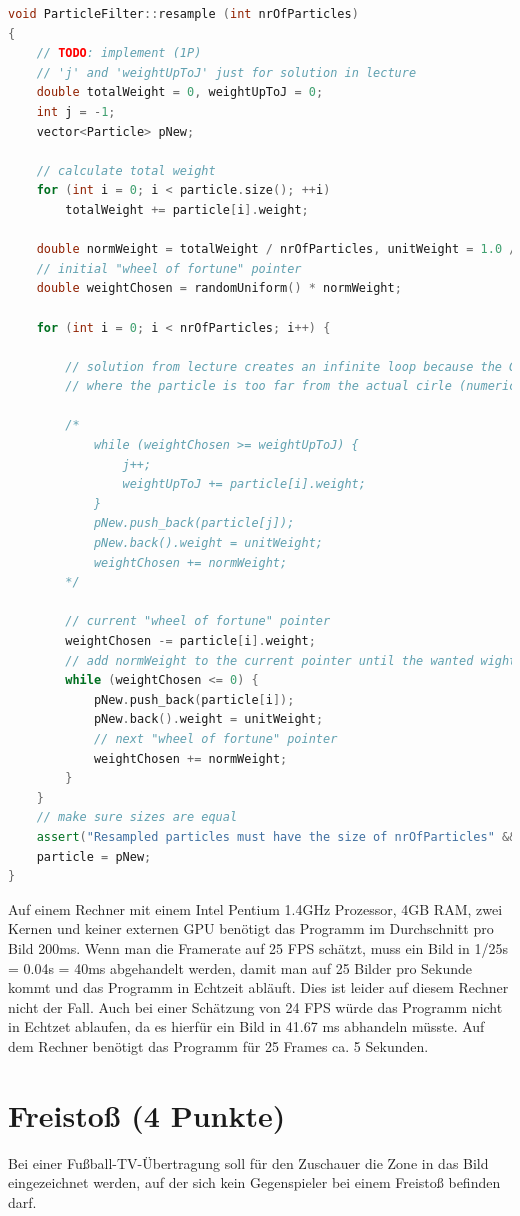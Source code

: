 \documentclass{ezb}
\begin{document}
\begin{lstlisting}[language=C++, caption=Draw particles from the particle set resetting their weight to 1.]
void ParticleFilter::resample (int nrOfParticles)
{
	// TODO: implement (1P)
	// 'j' and 'weightUpToJ' just for solution in lecture
	double totalWeight = 0, weightUpToJ = 0;
	int j = -1;
	vector<Particle> pNew;

	// calculate total weight
	for (int i = 0; i < particle.size(); ++i)
		totalWeight += particle[i].weight;

	double normWeight = totalWeight / nrOfParticles, unitWeight = 1.0 / nrOfParticles;
	// initial "wheel of fortune" pointer
	double weightChosen = randomUniform() * normWeight;

	for (int i = 0; i < nrOfParticles; i++) {

		// solution from lecture creates an infinite loop because the Gaussian distribution becomes 0 at some points
		// where the particle is too far from the actual cirle (numerical underflow)

		/*
			while (weightChosen >= weightUpToJ) {
				j++;
				weightUpToJ += particle[i].weight;
			}
			pNew.push_back(particle[j]);
			pNew.back().weight = unitWeight;
			weightChosen += normWeight;
		*/

		// current "wheel of fortune" pointer
		weightChosen -= particle[i].weight;
		// add normWeight to the current pointer until the wanted wight is archieved
		while (weightChosen <= 0) {
			pNew.push_back(particle[i]);
			pNew.back().weight = unitWeight;
			// next "wheel of fortune" pointer
			weightChosen += normWeight;
		}
	}
	// make sure sizes are equal
	assert("Resampled particles must have the size of nrOfParticles" && pNew.size() == nrOfParticles);
	particle = pNew;
}
\end{lstlisting}


Auf einem Rechner mit einem Intel Pentium 1.4GHz Prozessor, 4GB RAM, zwei Kernen und keiner externen GPU benötigt das Programm im Durchschnitt pro Bild 200ms. Wenn man die Framerate auf 25 FPS schätzt, muss ein Bild in 1/25s = 0.04s = 40ms  abgehandelt werden, damit man auf 25 Bilder pro Sekunde kommt und das Programm in Echtzeit abläuft. Dies ist leider auf diesem Rechner nicht der Fall. Auch bei einer Schätzung von 24 FPS würde das Programm nicht in Echtzet ablaufen, da es hierfür ein Bild in 41.67 ms abhandeln müsste. Auf dem Rechner benötigt das Programm für 25 Frames ca. 5 Sekunden.

\newpage
\section{Freistoß (4 Punkte)}
Bei einer Fußball-TV-Übertragung soll für den Zuschauer die Zone in das Bild eingezeichnet werden, auf der sich kein Gegenspieler bei einem Freistoß befinden darf.
\end{document}
